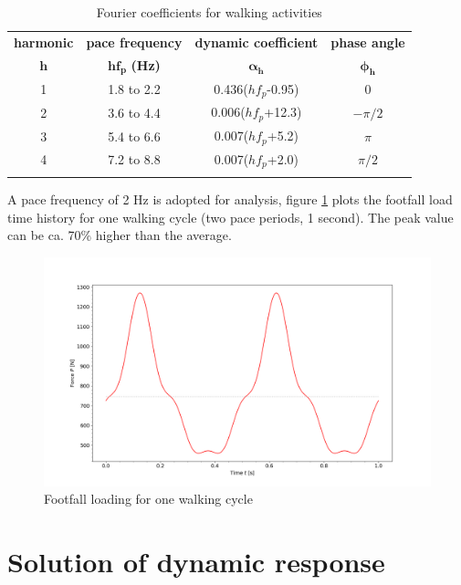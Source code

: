 {
\renewcommand{\arraystretch}{1.2}
\begin{table}[H]
\centering
\caption{Fourier coefficients for walking activities}
\label{tab:fourier coeff}
\begin{tabular}{cccc}
\Xhline{2\arrayrulewidth}
\textbf{harmonic} & \textbf{pace frequency} & \textbf{dynamic coefficient} & \textbf{phase angle} \\
$\boldsymbol{h}$    & $\boldsymbol{hf_p}$ \textbf{(Hz)}  & $\boldsymbol{\alpha_h}$        & $\boldsymbol{\phi_h}$ \\ \Xhline{2\arrayrulewidth}
1                 & 1.8 to 2.2              & 0.436($hf_p$-0.95)           & 0                    \\
2                 & 3.6 to 4.4              & 0.006($hf_p$+12.3)           & $-\pi/2$                    \\
3                 & 5.4 to 6.6              & 0.007($hf_p$+5.2)            & $\pi$                    \\
4                 & 7.2 to 8.8              & 0.007($hf_p$+2.0)            & $\pi/2$                    \\ \Xhline{2\arrayrulewidth}
\end{tabular}
\end{table}
}
\noindent
A pace frequency of 2 Hz is adopted for analysis, figure \ref{fig:footfall} plots the footfall load time history for one walking cycle (two pace periods, 1 second). The peak value can be ca. 70\% higher than the average.
\begin{figure}[H]
\centering
\includegraphics[width=1.0\textwidth]{images/footfall}
\caption{Footfall loading for one walking cycle}
\label{fig:footfall}
\end{figure}

\section{Solution of dynamic response}
